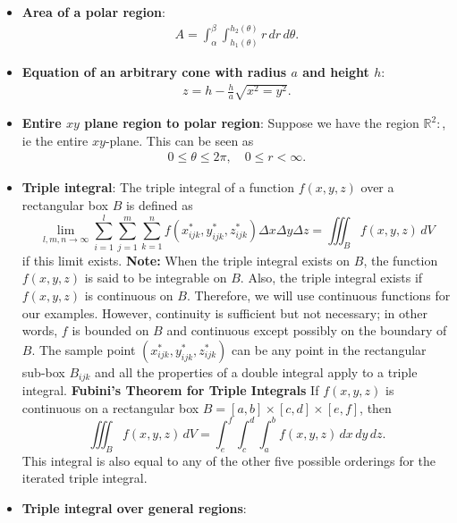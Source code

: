 \documentclass{report}
\begin{document}
\begin{itemize}
        \item \textbf{Area of a polar region}:
            \begin{align*}
                A = \int_{\alpha}^{\beta}\int_{h_{1}(\theta )}^{h_{2}(\theta )}r\, dr\, d\theta 
            .\end{align*}
        \item \textbf{Equation of an arbitrary cone with radius $a$ and height $h$}:
            \begin{align*}
                z = h - \frac{h}{a}\sqrt{x^{2} = y^{2}}
            .\end{align*}
        \item \textbf{Entire $xy$ plane region to polar region}: Suppose we have the region $\mathbb{R}^{2}:$, ie the entire $xy$-plane. This can be seen as
            \begin{align*}
                0 \leq \theta  \leq 2\pi, \quad 0 \leq r < \infty
            .\end{align*}
        \item \textbf{Triple integral}:
            The triple integral of a function $f(x,y,z)$ over a rectangular box $B$ is defined as
            \[
                \lim_{l,m,n \to \infty} \sum_{i=1}^{l} \sum_{j=1}^{m} \sum_{k=1}^{n} f(x^*_{ijk}, y^*_{ijk}, z^*_{ijk}) \Delta x \Delta y \Delta z = \iiint_B f(x,y,z) \, dV
            \]
            if this limit exists. 
            \bigbreak \noindent 
            \textbf{Note:} When the triple integral exists on $B$, the function $f(x,y,z)$ is said to be integrable on $B$. Also, the triple integral exists if $f(x,y,z)$ is continuous on $B$. Therefore, we will use continuous functions for our examples. However, continuity is sufficient but not necessary; in other words, $f$ is bounded on $B$ and continuous except possibly on the boundary of $B$.
            \bigbreak \noindent 
            The sample point $(x^*_{ijk}, y^*_{ijk}, z^*_{ijk})$ can be any point in the rectangular sub-box $B_{ijk}$ and all the properties of a double integral apply to a triple integral.
            \textbf{Fubini's Theorem for Triple Integrals}
            If $f(x,y,z)$ is continuous on a rectangular box $B = [a,b] \times [c,d] \times [e,f]$, then
            \[
                \iiint_B f(x,y,z) \, dV = \int_e^f \int_c^d \int_a^b f(x,y,z) \, dx \, dy \, dz.
            \]
            This integral is also equal to any of the other five possible orderings for the iterated triple integral.
        \item \textbf{Triple integral over general regions}:

\end{itemize}
\end{document}
